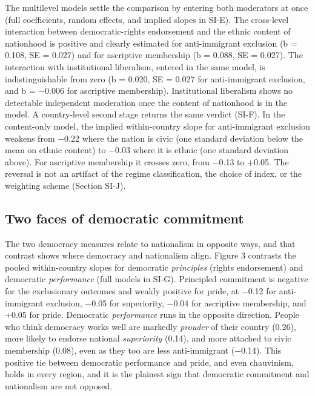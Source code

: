 The multilevel models settle the comparison by entering both moderators at once (full coefficients, random effects, and implied slopes in SI-E). The cross-level interaction between democratic-rights endorsement and the ethnic content of nationhood is positive and clearly estimated for anti-immigrant exclusion (b = 0.108, SE = 0.027) and for ascriptive membership (b = 0.088, SE = 0.027). The interaction with institutional liberalism, entered in the same model, is indistinguishable from zero (b = 0.020, SE = 0.027 for anti-immigrant exclusion, and b = −0.006 for ascriptive membership). Institutional liberalism shows no detectable independent moderation once the content of nationhood is in the model. A country-level second stage returns the same verdict (SI-F). In the content-only model, the implied within-country slope for anti-immigrant exclusion weakens from −0.22 where the nation is civic (one standard deviation below the mean on ethnic content) to −0.03 where it is ethnic (one standard deviation above). For ascriptive membership it crosses zero, from −0.13 to +0.05. The reversal is not an artifact of the regime classification, the choice of index, or the weighting scheme (Section SI-J).

\subsection{Two faces of democratic commitment}\label{two-faces-of-democratic-commitment}

The two democracy measures relate to nationalism in opposite ways, and that contrast shows where democracy and nationalism align. Figure 3 contrasts the pooled within-country slopes for democratic \emph{principles} (rights endorsement) and democratic \emph{performance} (full models in SI-G). Principled commitment is negative for the exclusionary outcomes and weakly positive for pride, at −0.12 for anti-immigrant exclusion, −0.05 for superiority, −0.04 for ascriptive membership, and +0.05 for pride. Democratic \emph{performance} runs in the opposite direction. People who think democracy works well are markedly \emph{prouder} of their country (0.26), more likely to endorse national \emph{superiority} (0.14), and more attached to civic membership (0.08), even as they too are less anti-immigrant (−0.14). This positive tie between democratic performance and pride, and even chauvinism, holds in every region, and it is the plainest sign that democratic commitment and nationalism are not opposed.

